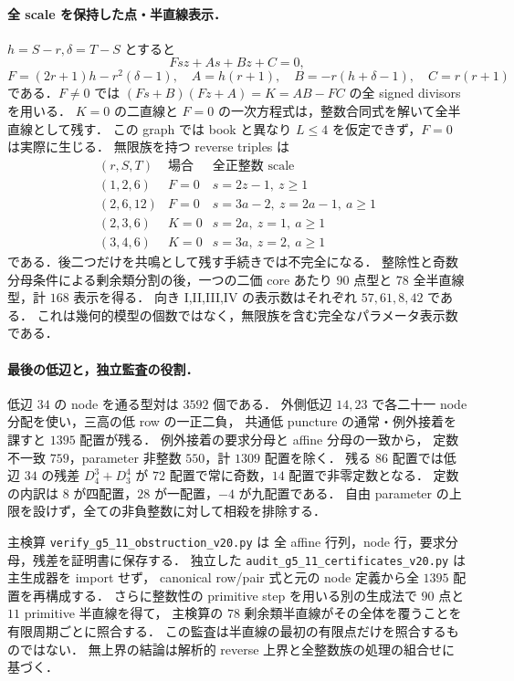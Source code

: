 \paragraph{全 scale を保持した点・半直線表示．}
$h=S-r,\delta=T-S$ とすると
\[
 Fsz+As+Bz+C=0,
\]
\[
 F=(2r+1)h-r^2(\delta-1),\quad
 A=h(r+1),\quad B=-r(h+\delta-1),\quad C=r(r+1)
\]
である．$F\ne0$ では
$(Fs+B)(Fz+A)=K=AB-FC$ の全 signed divisors を用いる．
$K=0$ の二直線と $F=0$ の一次方程式は，整数合同式を解いて全半直線として残す．
この graph では book と異なり $L\le4$ を仮定できず，$F=0$ は実際に生じる．
無限族を持つ reverse triples は
\[
\begin{array}{c|c|l}
(r,S,T)&\text{場合}&\text{全正整数 scale}\\\hline
(1,2,6)&F=0&s=2z-1,\ z\ge1\\
(2,6,12)&F=0&s=3a-2,\ z=2a-1,\ a\ge1\\
(2,3,6)&K=0&s=2a,\ z=1,\ a\ge1\\
(3,4,6)&K=0&s=3a,\ z=2,\ a\ge1
\end{array}
\]
である．後二つだけを共鳴として残す手続きでは不完全になる．
整除性と奇数分母条件による剰余類分割の後，一つの二価 core あたり
$90$ 点型と $78$ 全半直線型，計 $168$ 表示を得る．
向き I,II,III,IV の表示数はそれぞれ $57,61,8,42$ である．
これは幾何的模型の個数ではなく，無限族を含む完全なパラメータ表示数である．

\paragraph{最後の低辺と，独立監査の役割．}
低辺 $34$ の node を通る型対は $3592$ 個である．
外側低辺 $14,23$ で各二十一 node 分配を使い，三高の低 row の一正二負，
共通低 puncture の通常・例外接着を課すと $1395$ 配置が残る．
例外接着の要求分母と affine 分母の一致から，
定数不一致 $759$，parameter 非整数 $550$，計 $1309$ 配置を除く．
残る $86$ 配置では低辺 $34$ の残差 $D^3_4+D^4_3$ が
$72$ 配置で常に奇数，$14$ 配置で非零定数となる．
定数の内訳は $8$ が四配置，$28$ が一配置，$-4$ が九配置である．
自由 parameter の上限を設けず，全ての非負整数に対して相殺を排除する．

主検算 \nolinkurl{verify_g5_11_obstruction_v20.py} は
全 affine 行列，node 行，要求分母，残差を証明書に保存する．
独立した \nolinkurl{audit_g5_11_certificates_v20.py} は主生成器を import せず，
canonical row/pair 式と元の node 定義から全 $1395$ 配置を再構成する．
さらに整数性の primitive step を用いる別の生成法で
$90$ 点と $11$ primitive 半直線を得て，
主検算の $78$ 剰余類半直線がその全体を覆うことを有限周期ごとに照合する．
この監査は半直線の最初の有限点だけを照合するものではない．
無上界の結論は解析的 reverse 上界と全整数族の処理の組合せに基づく．
